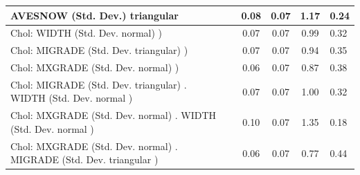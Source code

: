 \begin{table}
\begin{center}
\begin{tabular}{|l|l|c|c|c|l|}
			\hline
			AVESNOW (Std. Dev.) triangular &  & 0.08 & 0.07 & 1.17 & 0.24 \\
			\hline
			 Chol: WIDTH (Std. Dev. normal) ) &  & 0.07 & 0.07 & 0.99 & 0.32 \\
			\hline
			 Chol: MIGRADE (Std. Dev. triangular) ) &  & 0.07 & 0.07 & 0.94 & 0.35 \\
			\hline
			 Chol: MXGRADE (Std. Dev. normal) ) &  & 0.06 & 0.07 & 0.87 & 0.38 \\
			\hline
			 Chol: MIGRADE (Std. Dev. triangular) . WIDTH (Std. Dev.   normal ) &  & 0.07 & 0.07 & 1.00 & 0.32 \\
			\hline
			 Chol: MXGRADE (Std. Dev. normal) . WIDTH (Std. Dev.   normal ) &  & 0.10 & 0.07 & 1.35 & 0.18 \\
			\hline
			 Chol: MXGRADE (Std. Dev. normal) . MIGRADE (Std. Dev.   triangular ) &  & 0.06 & 0.07 & 0.77 & 0.44 \\
			\hline
		\end{tabular}
	\end{center}
\end{table}